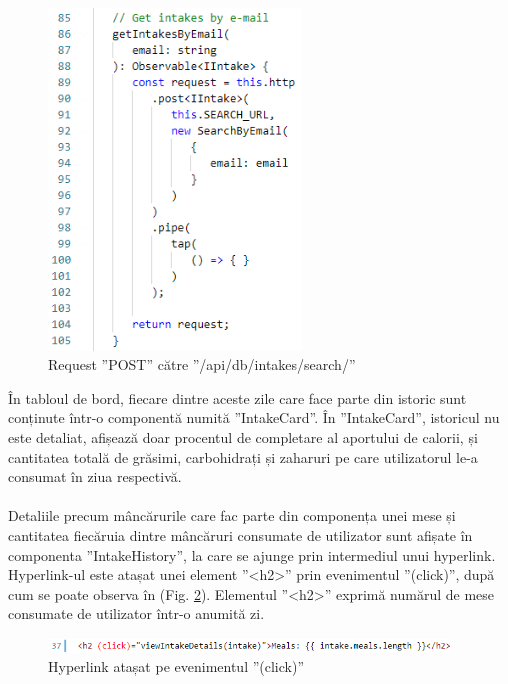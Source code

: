 \begin{figure}[!htb]
	\centering
	\includegraphics[width=0.6\textwidth]
	{../LaTeX/Images/implementare_getintakesbyemail.PNG}
	\caption{Request ”POST” către ”/api/db/intakes/search/”}
	\label{fig:65}
\end{figure}

În tabloul de bord, fiecare dintre aceste zile care face parte din istoric sunt conținute într-o componentă numită ”IntakeCard”. În ”IntakeCard”, istoricul nu este detaliat, afișează doar procentul de completare al aportului de calorii, și cantitatea totală de grăsimi, carbohidrați și zaharuri pe care utilizatorul le-a consumat în ziua respectivă.
\\ \\
Detaliile precum mâncărurile care fac parte din componența unei mese și cantitatea fiecăruia dintre mâncăruri consumate de utilizator sunt afișate în componenta ”IntakeHistory”, la care se ajunge prin intermediul unui hyperlink. Hyperlink-ul este atașat unei element ”<h2>” prin evenimentul ”(click)”, după cum se poate observa în (Fig. \ref{fig:66}). Elementul ”<h2>” exprimă numărul de mese consumate de utilizator într-o anumită zi.

\begin{figure}[!htb]
	\centering
	\includegraphics[width=0.95\textwidth]
	{../LaTeX/Images/implementare_hyperlink.PNG}
	\caption{Hyperlink atașat pe evenimentul ”(click)”}
	\label{fig:66}
\end{figure}

